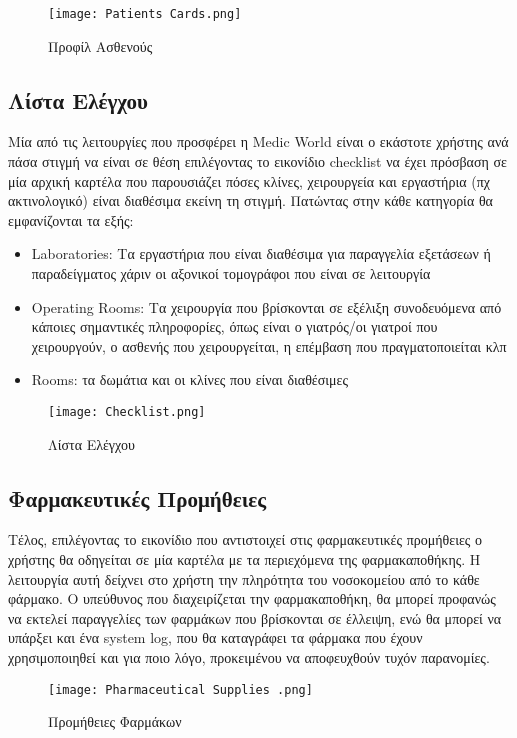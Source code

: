 \documentclass{article}
\begin{document}
\vspace{0.3cm}

\begin{figure}[!htb]
\centering
\texttt{[image: Patients Cards.png]}
\caption{\label{fig:patient profile} Προφίλ Ασθενούς}
\end{figure}


\subsection{Λίστα Ελέγχου}

Μία από τις λειτουργίες που προσφέρει η Medic World είναι ο εκάστοτε χρήστης ανά πάσα στιγμή να είναι σε θέση επιλέγοντας το εικονίδιο checklist να έχει πρόσβαση σε μία αρχική καρτέλα που παρουσιάζει πόσες κλίνες, χειρουργεία και εργαστήρια (πχ ακτινολογικό) είναι διαθέσιμα εκείνη τη στιγμή. Πατώντας στην κάθε κατηγορία θα εμφανίζονται τα εξής:

\begin{itemize}
  \item Laboratories: Τα εργαστήρια που είναι διαθέσιμα για παραγγελία εξετάσεων ή παραδείγματος χάριν οι αξονικοί τομογράφοι που είναι σε λειτουργία
  \item Operating Rooms: Τα χειρουργία που βρίσκονται σε εξέλιξη συνοδευόμενα από κάποιες σημαντικές πληροφορίες, όπως είναι ο γιατρός/οι γιατροί που χειρουργούν, ο ασθενής που χειρουργείται, η επέμβαση που πραγματοποιείται κλπ
  \item Rooms: τα δωμάτια και οι κλίνες που είναι διαθέσιμες
\end{itemize}

\vspace{0.3cm}

\begin{figure}[!htb]
\centering
\texttt{[image: Checklist.png]}
\caption{\label{fig:checklist} Λίστα Ελέγχου}
\end{figure}

\newpage

\subsection{Φαρμακευτικές Προμήθειες}

Τέλος, επιλέγοντας το εικονίδιο που αντιστοιχεί στις φαρμακευτικές προμήθειες ο χρήστης θα οδηγείται σε μία καρτέλα με τα περιεχόμενα της φαρμακαποθήκης. Η λειτουργία αυτή δείχνει στο χρήστη την πληρότητα του νοσοκομείου από το κάθε φάρμακο. Ο υπεύθυνος που διαχειρίζεται την φαρμακαποθήκη, θα μπορεί προφανώς να εκτελεί παραγγελίες των φαρμάκων που βρίσκονται σε έλλειψη, ενώ θα μπορεί να υπάρξει και ένα system log, που θα καταγράφει τα φάρμακα που έχουν χρησιμοποιηθεί και για ποιο λόγο, προκειμένου να αποφευχθούν τυχόν παρανομίες.

\vspace{0.3cm}

\begin{figure}[!htb]
\centering
\texttt{[image: Pharmaceutical Supplies .png]}
\caption{\label{fig:Medical Supplies} Προμήθειες Φαρμάκων}
\end{figure}
\end{document}
